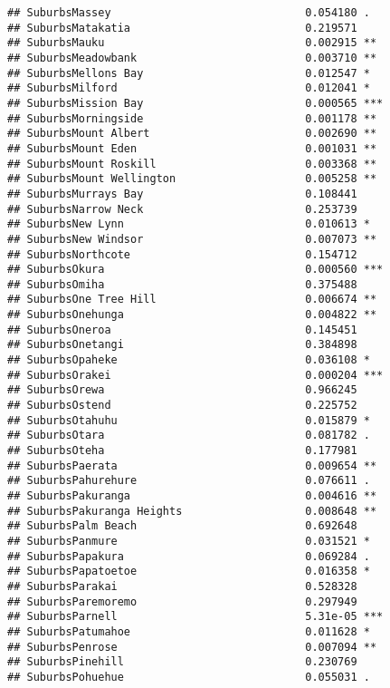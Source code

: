 \documentclass[
]{article}
\begin{document}
\begin{verbatim}
## SuburbsMassey                              0.054180 .  
## SuburbsMatakatia                           0.219571    
## SuburbsMauku                               0.002915 ** 
## SuburbsMeadowbank                          0.003710 ** 
## SuburbsMellons Bay                         0.012547 *  
## SuburbsMilford                             0.012041 *  
## SuburbsMission Bay                         0.000565 ***
## SuburbsMorningside                         0.001178 ** 
## SuburbsMount Albert                        0.002690 ** 
## SuburbsMount Eden                          0.001031 ** 
## SuburbsMount Roskill                       0.003368 ** 
## SuburbsMount Wellington                    0.005258 ** 
## SuburbsMurrays Bay                         0.108441    
## SuburbsNarrow Neck                         0.253739    
## SuburbsNew Lynn                            0.010613 *  
## SuburbsNew Windsor                         0.007073 ** 
## SuburbsNorthcote                           0.154712    
## SuburbsOkura                               0.000560 ***
## SuburbsOmiha                               0.375488    
## SuburbsOne Tree Hill                       0.006674 ** 
## SuburbsOnehunga                            0.004822 ** 
## SuburbsOneroa                              0.145451    
## SuburbsOnetangi                            0.384898    
## SuburbsOpaheke                             0.036108 *  
## SuburbsOrakei                              0.000204 ***
## SuburbsOrewa                               0.966245    
## SuburbsOstend                              0.225752    
## SuburbsOtahuhu                             0.015879 *  
## SuburbsOtara                               0.081782 .  
## SuburbsOteha                               0.177981    
## SuburbsPaerata                             0.009654 ** 
## SuburbsPahurehure                          0.076611 .  
## SuburbsPakuranga                           0.004616 ** 
## SuburbsPakuranga Heights                   0.008648 ** 
## SuburbsPalm Beach                          0.692648    
## SuburbsPanmure                             0.031521 *  
## SuburbsPapakura                            0.069284 .  
## SuburbsPapatoetoe                          0.016358 *  
## SuburbsParakai                             0.528328    
## SuburbsParemoremo                          0.297949    
## SuburbsParnell                             5.31e-05 ***
## SuburbsPatumahoe                           0.011628 *  
## SuburbsPenrose                             0.007094 ** 
## SuburbsPinehill                            0.230769    
## SuburbsPohuehue                            0.055031 .  

\end{verbatim}
\end{document}
